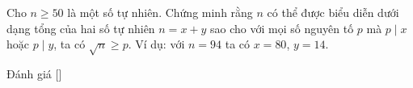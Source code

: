 \ifshowproblem
\begin{problem}\label{problem:IRN-2015-MO2-P6}
	Cho $n \ge 50$ là một số tự nhiên. Chứng minh rằng $n$ có thể được biểu diễn dưới dạng tổng của hai số tự nhiên $n = x + y$
	sao cho với mọi số nguyên tố $p$ mà $p \mid x$ hoặc $p \mid y$, ta có $\sqrt{n} \ge p$.  
	Ví dụ: với $n = 94$ ta có $x = 80$, $y = 14$.
\end{problem}
\fi

\ifshowinfo
Đánh giá [\textbf{}]\footnotemark
{}
\fi